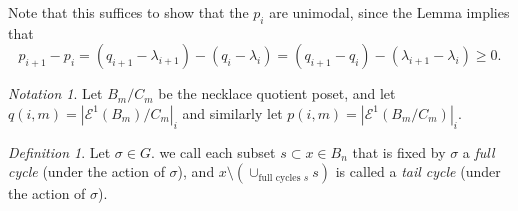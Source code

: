 \documentclass[10 pt]{amsart}
\theoremstyle{plain}
\theoremstyle{definition}
\theoremstyle{remark}
\numberwithin{equation}{section}
\theoremstyle{remark}
\newtheorem{defn}[thm]{Definition}
\newtheorem{note}[thm]{Notation}
\begin{document}
Note that this suffices to show that the $p_i$ are unimodal, since the Lemma implies that
$$p_{i+1} - p_{i} = (q_{i+1} - \lambda_{i+1}) - (q_i - \lambda_i) = (q_{i+1} - q_i) - (\lambda_{i+1}- \lambda_i) \ge 0.$$ 

\begin{note} Let $B_m/C_m$ be the necklace quotient poset, and let $q (i, m) = |\mathcal E^1 (B_m)/C_m|_{i}$ and similarly let $p (i, m) = |\mathcal E^1 (B_m/C_m)|_{i}$. 
\end{note}

\begin{defn}
Let  $\sigma \in G.$ we call each subset $s \subset x \in B_n$ that is fixed by $\sigma$ a \textit{full cycle} (under the action of $\sigma$), and $x \setminus \left(\cup_{\text{full cycles } s} s\right)$ is called a \textit{tail cycle} (under the action of $\sigma$).  
\end{defn}
\end{document}
